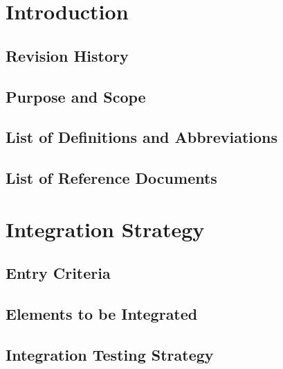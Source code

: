 \documentclass[12pt, a4paper]{article}
\title{
	\Huge{\textbf{\centerline{myTaxiService}}}
	\newline
	\huge{\textbf{I}ntegration \textbf{T}est \textbf{P}lan}
}
\author{
	Monica Magoni 854091
	\\
	Alberto Cibari 852689
}
\date{\today}
\begin{document}
	\maketitle
	\newpage
	\renewcommand*\contentsname{\Huge{Contents}}
	\tableofcontents
	
	\newpage
    \section{Introduction}
    	\subsection{Revision History}
    	
    	
    	\subsection{Purpose and Scope}
    	
    	
    	\subsection{List of Definitions and Abbreviations}
    	
    	
    	\subsection{List of Reference Documents}
    	
    	
    \newpage
    \section{Integration Strategy}
        \subsection{Entry Criteria}
    	
        
        \subsection{Elements to be Integrated}
    	
    	
    	\subsection{Integration Testing Strategy}
    	
    	
\end{document}
